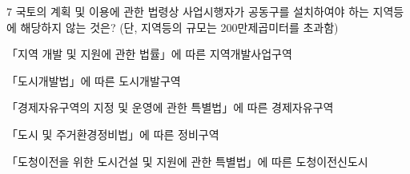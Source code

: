 \begin{question}{7}
국토의 계획 및 이용에 관한 법령상 사업시행자가 공동구를 설치하여야 하는 지역등에 해당하지 않는 것은? (단, 지역등의 규모는 200만제곱미터를 초과함)
\begin{choices}
  \item 「지역 개발 및 지원에 관한 법률」에 따른 지역개발사업구역
  \item 「도시개발법」에 따른 도시개발구역
  \item 「경제자유구역의 지정 및 운영에 관한 특별법」에 따른 경제자유구역
  \item 「도시 및 주거환경정비법」에 따른 정비구역
  \item 「도청이전을 위한 도시건설 및 지원에 관한 특별법」에 따른 도청이전신도시
\end{choices}
\end{question}
